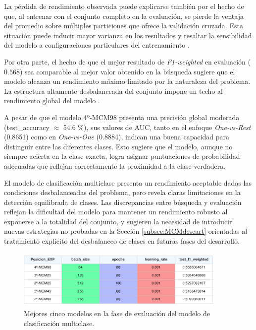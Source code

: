 La pérdida de rendimiento observada puede explicarse también por el hecho de que, al entrenar con el conjunto completo en la evaluación, se pierde la ventaja del promedio sobre múltiples particiones que ofrece la validación cruzada. Esta situación puede inducir mayor varianza en los resultados y resaltar la sensibilidad del modelo a configuraciones particulares del entrenamiento \cite{dietterich1998approx}.

Por otra parte, el hecho de que el mejor resultado de \textit{F1-weighted} en evaluación ($0{.}568$) sea comparable al mejor valor obtenido en la búsqueda sugiere que el modelo alcanza un rendimiento máximo limitado por la naturaleza del problema. La estructura altamente desbalanceada del conjunto impone un techo al rendimiento global del modelo \cite{japkowicz2002class}.

A pesar de que el modelo 4º-MCM98 presenta una precisión global moderada (test\_accuracy $\approx$ 54.6 \%), sus valores de AUC, tanto en el enfoque \textit{One-vs-Rest} (0.8651) como en \textit{One-vs-One} (0.8884), indican una buena capacidad para distinguir entre las diferentes clases. Esto sugiere que el modelo, aunque no siempre acierta en la clase exacta, logra asignar puntuaciones de probabilidad adecuadas que reflejan correctamente la proximidad a la clase verdadera.


El modelo de clasificación multiclase presenta un rendimiento aceptable dadas las condiciones desbalanceadas del problema, pero revela claras limitaciones en la detección equilibrada de clases. Las discrepancias entre búsqueda y evaluación reflejan la dificultad del modelo para mantener un rendimiento robusto al exponerse a la totalidad del conjunto, y sugieren la necesidad de introducir nuevas estrategias no probadas en la Sección \ref{subsec:MCMdescart}  orientadas al tratamiento explícito del desbalanceo de clases en futuras fases del desarrollo.

\begin{figure}[H]
    \centering
    \includegraphics[width=0.9\textwidth]{./img/evaluacion/resultados/top5EVALMCM.pdf}
    \caption{Mejores cinco modelos en la fase de evaluación del modelo de clasificación multiclase.}
    \label{fig:top5EVALMCM}
\end{figure}

